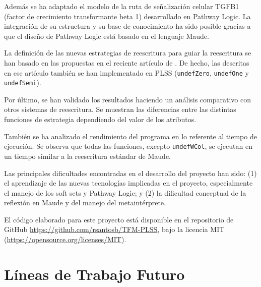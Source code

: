 Además se ha adaptado el modelo de la ruta de señalización celular TGFB1 (factor de crecimiento transformante beta 1) desarrollado en Pathway Logic.
La integración de su estructura y su base de conocimiento ha sido posible gracias a que el diseño de Pathway Logic está basado en el lenguaje Maude.

La definición de las nuevas estrategias de reescritura para guiar la reescritura se han basado en las propuestas en el reciente artículo de \citet{santos2019soft}.
De hecho, las descritas en ese artículo también se han implementado en PLSS (\texttt{undefZero}, \texttt{undefOne} y \texttt{undefSemi}).

Por último, se han validado los resultados haciendo un análisis comparativo con otros sistemas de reescritura. 
Se muestran las diferencias entre las distintas funciones de estrategia dependiendo del valor de los atributos.

También se ha analizado el rendimiento del programa en lo referente al tiempo de ejecución. Se observa que todas las funciones, excepto \texttt{undefWCol}, se ejecutan en un tiempo similar a la reescritura estándar de Maude.
\medskip


Las principales dificultades encontradas en el desarrollo del proyecto han sido:
(1) el aprendizaje de las nuevas tecnologías implicadas en el proyecto, especialmente el manejo de los soft sets y Pathway Logic; y 
(2) la dificultad conceptual de la reflexión en Maude y del manejo del metaintérprete.
\medskip


El código elaborado para este proyecto está disponible en el repositorio de GitHub
\url{https://github.com/rsantosb/TFM-PLSS}, bajo la licencia MIT (\url{https://opensource.org/licenses/MIT}).



\section{Líneas de Trabajo Futuro}


